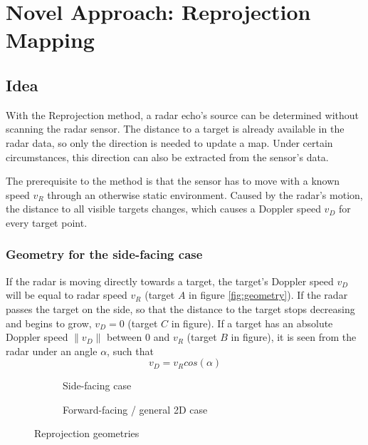 
\chapter{Novel Approach: Reprojection
Mapping}\label{novel-approach-reprojection-mapping}

\section{Idea}\label{idea}

With the Reprojection method, a radar echo's source can be determined
without scanning the radar sensor. The distance to a target is already
available in the radar data, so only the direction is needed to update a
map. Under certain circumstances, this direction can also be extracted
from the sensor's data.

The prerequisite to the method is that the sensor has to move with a
known speed \(v_R\) through an otherwise static environment. Caused by
the radar's motion, the distance to all visible targets changes, which
causes a Doppler speed \(v_D\) for every target point.

\subsection{Geometry for the side-facing
case}\label{geometry-for-the-side-facing-case}

If the radar is moving directly towards a target, the target's Doppler
speed \(v_D\) will be equal to radar speed \(v_R\) (target \(A\) in
figure \ref{fig:geometry}). If the radar passes the target on the side, so that the
distance to the target stops decreasing and begins to grow, \(v_D = 0\)
(target \(C\) in figure). If a target has an absolute Doppler speed
\(\|v_D\|\) between \(0\) and \(v_R\) (target \(B\) in figure), it is seen
from the radar under an angle \(\alpha\), such that
\[v_D = v_R cos(\alpha)\]

\begin{figure}[htp]
    \centering
    \footnotesize
    \label{fig:geometry}
    \begin{subfigure}{0.45\textwidth}
        \def\svgwidth{\linewidth}
        
        \caption{Side-facing case}
    \end{subfigure}
    \hfill
    \begin{subfigure}{0.45\textwidth}
        \def\svgwidth{\linewidth}
        
        \caption{Forward-facing / general 2D case}
    \end{subfigure}
    \caption{Reprojection geometries}
\end{figure}

